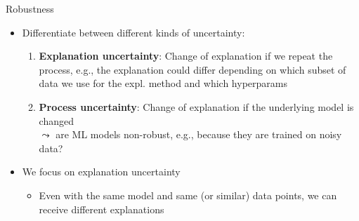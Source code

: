 \documentclass[10pt,compress,t,notes=noshow, xcolor=table]{beamer}
\begin{document}
\begin{frame}[c]{Robustness}
		\begin{itemize}
		\item Differentiate between different kinds of uncertainty: 
		\begin{enumerate}
			\item \textbf{Explanation uncertainty}: Change of explanation if we repeat the process, e.g., the explanation could differ depending on which subset of data we use for the expl. method and which hyperparams 
			\pause
			\item \textbf{Process uncertainty}: Change of explanation if the underlying model is changed\\ $\leadsto$ are ML models non-robust, e.g., because they are trained on noisy data?
		\end{enumerate}
		\pause
		\item We focus on explanation uncertainty 
		\begin{itemize}
		    \item Even with the same model and same (or similar) data points, we can receive different explanations
		\end{itemize}
	\end{itemize}
\end{frame}
\end{document}
